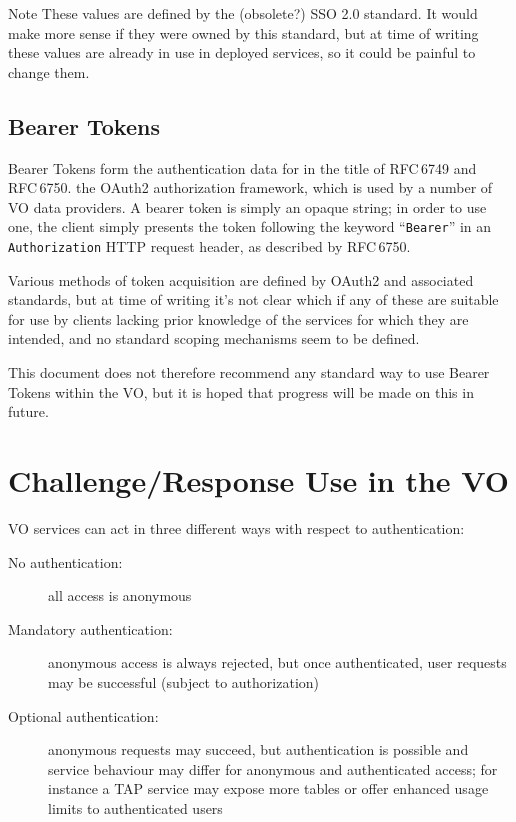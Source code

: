 \documentclass[11pt,a4paper]{ivoa}
\newcommand{\rfc}[1]{RFC\,#1}
\newcommand{\header}[1]{{\tt #1}}
\begin{document}
\begin{admonition}{Note}
  These values are defined by the (obsolete?) SSO 2.0 standard.
  It would make more sense if they were owned by this standard,
  but at time of writing these values are already in use in
  deployed services, so it could be painful to change them.
\end{admonition}


\subsection{Bearer Tokens}

Bearer Tokens form the authentication data for
in the title of \rfc{6749} and \rfc{6750}.
the OAuth2 authorization framework,
which is used by a number of VO data providers.
A bearer token is simply an opaque string;
in order to use one, the client simply presents the token
following the keyword ``{\tt Bearer}''
in an \header{Authorization} HTTP request header,
as described by \rfc{6750}.

Various methods of token acquisition are defined by OAuth2 and
associated standards, but at time of writing it's not clear which if
any of these are suitable for use by clients lacking prior knowledge
of the services for which they are intended,
and no standard scoping mechanisms seem to be defined.

This document does not therefore recommend any standard way
to use Bearer Tokens within the VO, but it is hoped that
progress will be made on this in future.



\section{Challenge/Response Use in the VO}

VO services can act in three different ways with respect to authentication:
\begin{description}
  \item[No authentication:]
       all access is anonymous
  \item[Mandatory authentication:]
       anonymous access is always rejected, but once authenticated,
       user requests may be successful (subject to authorization)
  \item[Optional authentication:]
       anonymous requests may succeed, but authentication is possible
       and service behaviour may differ for anonymous and authenticated access;
       for instance a TAP service may expose more tables or offer enhanced
       usage limits to authenticated users
\end{description}
\end{document}
